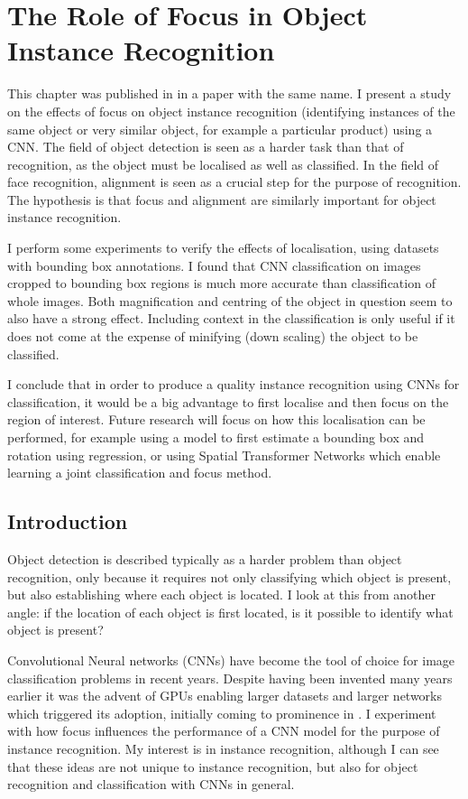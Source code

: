 
\chapter{The Role of Focus in Object Instance Recognition}
\label{chap:focus}

This chapter was published in \cite{Batchelor2017} in a paper with the same name. I present a study on the effects of focus on object instance recognition (identifying instances of the same object or very similar object, for example a particular product) using a \gls{CNN}. The field of object detection is seen as a harder task than that of recognition, as the object must be localised as well as classified. In the field of face recognition, alignment is seen as a crucial step for the purpose of recognition. The hypothesis is that focus and alignment are similarly important for object instance recognition. 

I perform some experiments to verify the effects of localisation, using datasets with bounding box annotations. I found that CNN classification on images cropped to bounding box regions is much more accurate than classification of whole images. Both magnification and centring of the object in question seem to also have a strong effect. Including context in the classification is only useful if it does not come at the expense of minifying (down scaling) the object to be classified.
 
I conclude that in order to produce a quality instance recognition using \gls{CNN}s for classification, it would be a big advantage to first localise and then focus on the region of interest. Future research will focus on how this localisation can be performed, for example using a model to first estimate a bounding box and rotation using regression, or using Spatial Transformer Networks which enable learning a joint classification and focus method.

\section{Introduction}

Object detection is described typically as a harder problem than object recognition, only because it requires not only classifying which object is present, but also establishing where each object is located. I look at this from another angle: if the location of each object is first located, is it possible to identify what object is present? 

Convolutional Neural networks (\gls{CNN}s) \cite{LeCun1998} have become the tool of choice for image classification problems in recent years. Despite having been invented many years earlier it was the advent of \gls{GPU}s enabling larger datasets and larger networks which triggered its adoption, initially coming to prominence in \cite {Krizhevsky2012}.  I experiment with how focus influences the performance of a CNN model for the purpose of instance recognition. My interest is in instance recognition, although I can see that these ideas are not unique to instance recognition, but also for object recognition and classification with \gls{CNN}s in general.

